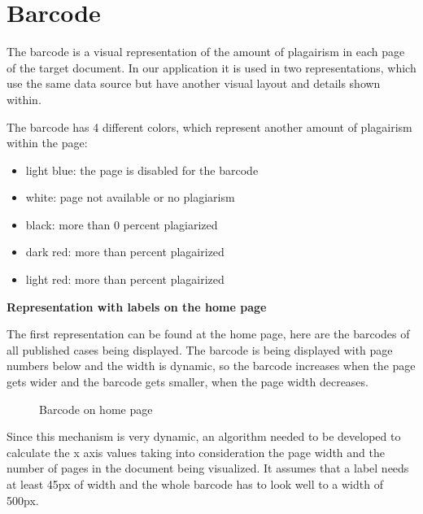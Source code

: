 \section{Barcode}
The barcode is a visual representation of the amount of plagairism in each page of the target document. In our application it is used in two representations, which use the same data source but have another visual layout and details shown within.

The barcode has 4 different colors, which represent another amount of plagairism within the page:

\begin{itemize}
\item      light blue: the page is disabled for the barcode
\item      white: page not available or no plagiarism
\item      black: more than 0 percent plagiarized
\item      dark red: more than percent plagairized
\item      light red: more than percent plagairized
\end{itemize}

\textbf{Representation with labels on the home page}

The first representation can be found at the home page, here are the barcodes of all published cases being displayed. The barcode is being displayed with page numbers below and the width is dynamic, so the barcode increases when the page gets wider and the barcode gets smaller, when the page width decreases. 

\begin{figure}[!h]
  \centering
  \caption{Barcode on home page}
  \label{fig:feature-barcode-website}
\end{figure}

Since this mechanism is very dynamic, an algorithm needed to be developed to calculate the x axis values taking into consideration the page width and the number of pages in the document being visualized. It assumes that a label needs at least 45px of width and the whole barcode has to look well to a width of 500px.

